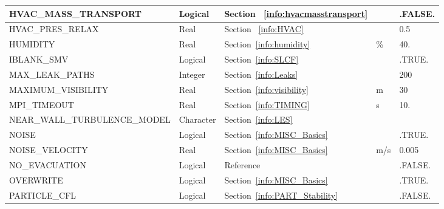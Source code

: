 \documentclass[11pt]{book}
\begin{document}
\begin{longtable}{@{\extracolsep{\fill}}|l|l|l|l|l|}
{\ct HVAC\_MASS\_TRANSPORT}                     & Logical       & Section ~\ref{info:hvacmasstransport}                 &               & {\ct .FALSE.}     \\ \hline
{\ct HVAC\_PRES\_RELAX}                         & Real          & Section ~\ref{info:HVAC}                              &               & 0.5               \\ \hline
{\ct HUMIDITY}                                  & Real          & Section~\ref{info:humidity}                           & \%            & 40.               \\ \hline
{\ct IBLANK\_SMV}                               & Logical       & Section~\ref{info:SLCF}                               &               & {\ct .TRUE.}      \\ \hline
{\ct MAX\_LEAK\_PATHS}                          & Integer       & Section~\ref{info:Leaks}                              &               &  200              \\ \hline
{\ct MAXIMUM\_VISIBILITY}                       & Real          & Section~\ref{info:visibility}                         &  m            &  30               \\ \hline
{\ct MPI\_TIMEOUT}                              & Real          & Section~\ref{info:TIMING}                             &  s            & 10.               \\ \hline
{\ct NEAR\_WALL\_TURBULENCE\_MODEL}             & Character     & Section~\ref{info:LES}                                &               &                   \\ \hline
{\ct NOISE}                                     & Logical       & Section~\ref{info:MISC_Basics}                        &               & {\ct .TRUE.}      \\ \hline
{\ct NOISE\_VELOCITY}                           & Real          & Section~\ref{info:MISC_Basics}                        &  m/s          & 0.005             \\ \hline
{\ct NO\_EVACUATION}                            & Logical       & Reference~\cite{FDS_Evac_Users_Guide}                 &               & {\ct .FALSE.}     \\ \hline
{\ct OVERWRITE}                                 & Logical       & Section~\ref{info:MISC_Basics}                        &               & {\ct .TRUE.}      \\ \hline
{\ct PARTICLE\_CFL}                             & Logical       & Section~\ref{info:PART_Stability}                     &               & {\ct .FALSE.}     \\ \hline

\end{longtable}
\end{document}
